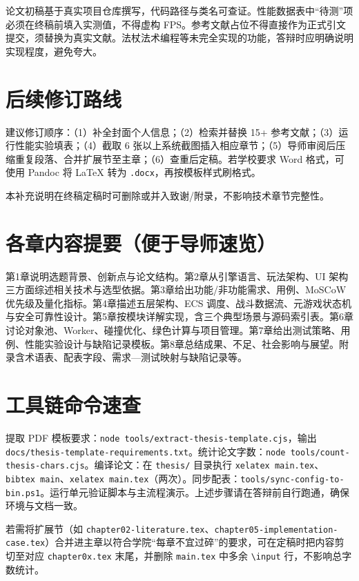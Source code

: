 论文初稿基于真实项目仓库撰写，代码路径与类名可查证。性能数据表中“待测”项必须在终稿前填入实测值，不得虚构 FPS。参考文献占位不得直接作为正式引文提交，须替换为真实文献。法杖法术编程等未完全实现的功能，答辩时应明确说明实现程度，避免夸大。

\section{后续修订路线}

建议修订顺序：（1）补全封面个人信息；（2）检索并替换 15+ 参考文献；（3）运行性能实验填表；（4）截取 6 张以上系统截图插入相应章节；（5）导师审阅后压缩重复段落、合并扩展节至主章；（6）查重后定稿。若学校要求 Word 格式，可使用 Pandoc 将 LaTeX 转为 \texttt{.docx}，再按模板样式刷格式。

本补充说明在终稿定稿时可删除或并入致谢/附录，不影响技术章节完整性。

\section{各章内容提要（便于导师速览）}

第1章说明选题背景、创新点与论文结构。第2章从引擎语言、玩法架构、UI 架构三方面综述相关技术与选型依据。第3章给出功能/非功能需求、用例、MoSCoW 优先级及量化指标。第4章描述五层架构、ECS 调度、战斗数据流、元游戏状态机与安全可靠性设计。第5章按模块详解实现，含三个典型场景与源码索引表。第6章讨论对象池、Worker、碰撞优化、绿色计算与项目管理。第7章给出测试策略、用例、性能实验设计与缺陷记录模板。第8章总结成果、不足、社会影响与展望。附录含术语表、配表字段、需求—测试映射与缺陷记录等。

\section{工具链命令速查}

提取 PDF 模板要求：\texttt{node tools/extract-thesis-template.cjs}，输出 \texttt{docs/thesis-template-requirements.txt}。统计论文字数：\texttt{node tools/count-thesis-chars.cjs}。编译论文：在 \texttt{thesis/} 目录执行 \texttt{xelatex main.tex}、\texttt{bibtex main}、\texttt{xelatex main.tex}（两次）。同步配表：\texttt{tools/sync-config-to-bin.ps1}。运行单元验证脚本与主流程演示。上述步骤请在答辩前自行跑通，确保环境与文档一致。

若需将扩展节（如 \texttt{chapter02-literature.tex}、\texttt{chapter05-implementation-case.tex}）合并进主章以符合学院“每章不宜过碎”的要求，可在定稿时把内容剪切至对应 \texttt{chapter0x.tex} 末尾，并删除 \texttt{main.tex} 中多余 \texttt{\textbackslash input} 行，不影响总字数统计。
